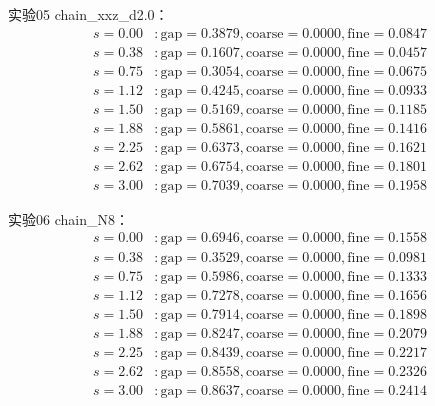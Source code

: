 \documentclass[11pt,a4paper]{book}
\theoremstyle{definition}
\begin{document}
实验05 chain\_xxz\_d2.0：
\begin{align*}
s=0.00 &: \text{gap}=0.3879, \text{coarse}=0.0000, \text{fine}=0.0847 \\
s=0.38 &: \text{gap}=0.1607, \text{coarse}=0.0000, \text{fine}=0.0457 \\
s=0.75 &: \text{gap}=0.3054, \text{coarse}=0.0000, \text{fine}=0.0675 \\
s=1.12 &: \text{gap}=0.4245, \text{coarse}=0.0000, \text{fine}=0.0933 \\
s=1.50 &: \text{gap}=0.5169, \text{coarse}=0.0000, \text{fine}=0.1185 \\
s=1.88 &: \text{gap}=0.5861, \text{coarse}=0.0000, \text{fine}=0.1416 \\
s=2.25 &: \text{gap}=0.6373, \text{coarse}=0.0000, \text{fine}=0.1621 \\
s=2.62 &: \text{gap}=0.6754, \text{coarse}=0.0000, \text{fine}=0.1801 \\
s=3.00 &: \text{gap}=0.7039, \text{coarse}=0.0000, \text{fine}=0.1958
\end{align*}

实验06 chain\_N8：
\begin{align*}
s=0.00 &: \text{gap}=0.6946, \text{coarse}=0.0000, \text{fine}=0.1558 \\
s=0.38 &: \text{gap}=0.3529, \text{coarse}=0.0000, \text{fine}=0.0981 \\
s=0.75 &: \text{gap}=0.5986, \text{coarse}=0.0000, \text{fine}=0.1333 \\
s=1.12 &: \text{gap}=0.7278, \text{coarse}=0.0000, \text{fine}=0.1656 \\
s=1.50 &: \text{gap}=0.7914, \text{coarse}=0.0000, \text{fine}=0.1898 \\
s=1.88 &: \text{gap}=0.8247, \text{coarse}=0.0000, \text{fine}=0.2079 \\
s=2.25 &: \text{gap}=0.8439, \text{coarse}=0.0000, \text{fine}=0.2217 \\
s=2.62 &: \text{gap}=0.8558, \text{coarse}=0.0000, \text{fine}=0.2326 \\
s=3.00 &: \text{gap}=0.8637, \text{coarse}=0.0000, \text{fine}=0.2414
\end{align*}
\end{document}
